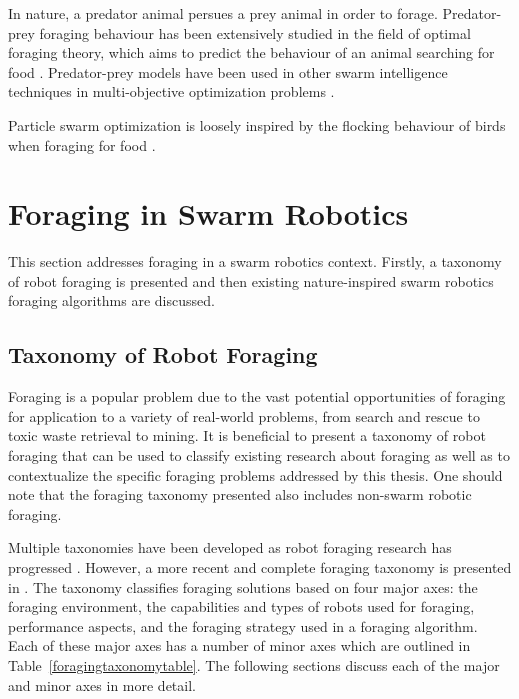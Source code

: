 In nature, a predator animal persues a prey animal in order to forage. Predator-prey foraging behaviour has been extensively studied in the field of optimal foraging theory, which aims to predict the behaviour of an animal searching for food \cite{charnov1976optimal}. Predator-prey models have been used in other swarm intelligence techniques in multi-objective optimization problems \cite{nolfi1998coevolving}.

Particle swarm optimization is loosely inspired by the flocking behaviour of birds when foraging for food \cite{kennedy1995particle}.

\section{Foraging in Swarm Robotics}
\label{foraging:foraginginswarmrobotics}
This section addresses foraging in a swarm robotics context. Firstly, a taxonomy of robot foraging is presented and then existing nature-inspired swarm robotics foraging algorithms are discussed.

\subsection{Taxonomy of Robot Foraging}
\label{sec:second:taxonomy}

Foraging is a popular problem due to the vast potential opportunities of foraging for application to a variety of real-world problems, from search and rescue \cite{jennings1997cooperative} to toxic waste retrieval to mining. It is beneficial to present a taxonomy of robot foraging that can be used to classify existing research about foraging as well as to contextualize the specific foraging problems addressed by this thesis. One should note that the foraging taxonomy presented also includes non-swarm robotic foraging.

Multiple taxonomies have been developed as robot foraging research has progressed \cite{oster1978caste,ostergaard2001emergent}. However, a more recent and complete foraging taxonomy is presented in \cite{winfield2009foraging}. The taxonomy classifies foraging solutions based on four major axes: the foraging environment, the capabilities and types of robots used for foraging, performance aspects, and the foraging strategy used in a foraging algorithm. Each of these major axes has a number of minor axes which are outlined in Table~\ref{foragingtaxonomytable}.  The following sections discuss each of the major and minor axes in more detail.

